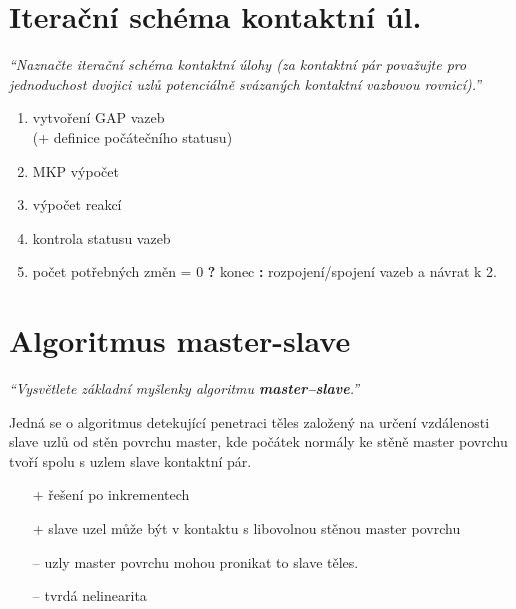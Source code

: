\documentclass{article}
\begin{document}
\begin{multicols}{2}
	\vfill\null
	\columnbreak
	
	\section{Iterační schéma kontaktní úl.}
	\emph{``Naznačte iterační schéma kontaktní úlohy (za kontaktní pár považujte pro jednoduchost dvojici uzlů potenciálně svázaných kontaktní vazbovou rovnicí).''}

	\begin{enumerate}
		\item vytvoření GAP vazeb \\(+ definice počátečního statusu)
		\item MKP výpočet
		\item výpočet reakcí
		\item kontrola statusu vazeb
		\item počet potřebných změn = 0 \textbf{?} konec \textbf{:} rozpojení/spojení vazeb a návrat k 2.
	\end{enumerate}

	\section{Algoritmus master-slave}
	\emph{``Vysvětlete základní myšlenky algoritmu \textbf{master–slave}.''}

	Jedná se o algoritmus detekující penetraci těles založený na určení vzdálenosti slave uzlů od stěn povrchu master, kde počátek normály ke stěně master povrchu tvoří spolu s uzlem slave kontaktní pár.

	\begin{itemize}
	\item [+] řešení po inkrementech
	\item [+] slave uzel může být v kontaktu s libovolnou stěnou master povrchu
	\item [--] uzly master povrchu mohou pronikat to slave těles.
	\item [--] tvrdá nelinearita
	\end{itemize}

	\end{multicols}
\end{document}
